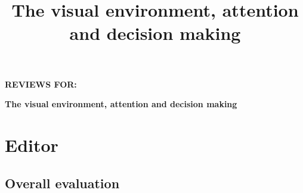 \documentclass[english,natbib,man,floatsintext]{apa6}
\title{The visual environment, attention and decision making}
\begin{document}



\singlespacing
\begin{center}

{\Large \textbf{REVIEWS FOR:}}

\vspace{1cm}

{\Large \textbf{The visual environment, attention and decision making}}

\vspace{5mm}


\vspace{1cm}
\end{center}



\section{Editor}
\label{rev:editor}

\subsection{Overall evaluation}
\end{document}
